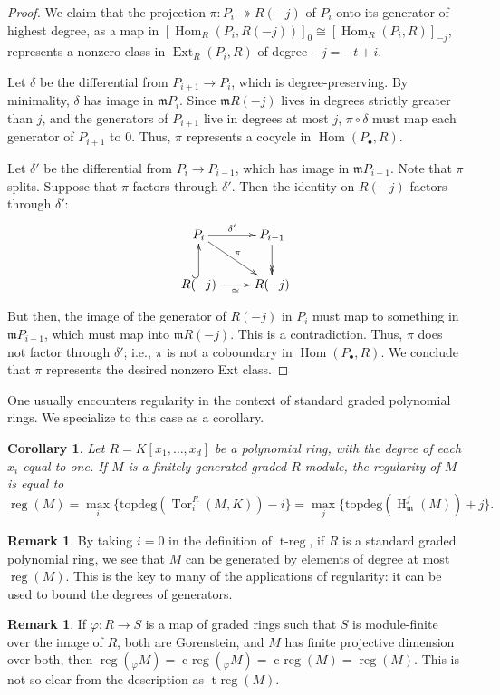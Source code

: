 \documentclass[11pt]{book}
\newtheorem{corollary}[theorem]{Corollary}
\numberwithin{equation}{section}
\numberwithin{theorem}{chapter}
\theoremstyle{definition}
\newtheorem*{basic properties}{Basic Properties}
\newtheorem*{Important Remark}{Important Remark}
\newtheorem{remark}[theorem]{Remark}
\theoremstyle{remark}
\newcommand{\m}{\mathfrak{m}}
\newcommand{\Hom}{\operatorname{Hom}}
\newcommand{\Ext}{\operatorname{Ext}}
\newcommand{\Tor}{\operatorname{Tor}}
\newcommand{\reg}{\operatorname{reg}}
\newcommand{\Treg}{\operatorname{t-reg}}
\newcommand{\Lreg}{\operatorname{c-reg}}
\newcommand{\tp}{\mathrm{topdeg}}
\renewcommand{\H}{\operatorname{H}}
\begin{document}
\begin{proof}
 We claim that the projection $\pi: P_i \twoheadrightarrow R(-j)$ of $P_i$ onto its generator of highest degree, as a map in $[\Hom_R(P_i,R(-j))]_0 \cong [\Hom_R(P_i,R)]_{-j}$, represents a nonzero class in $\Ext_R(P_i,R)$ of degree $-j=-t+i$. 
 
 Let $\delta$ be the differential from $P_{i+1}\to P_i$, which is degree-preserving. By minimality, $\delta$ has image in $\m P_i$. Since $\m R(-j)$ lives in degrees strictly greater than $j$, and the generators of $P_{i+1}$ live in degrees at most $j$, $\pi \circ \delta$ must map each generator of $P_{i+1}$ to $0$. Thus, $\pi$ represents a cocycle in $\Hom(P_\bullet,R)$. 

Let $\delta'$ be the differential from $P_{i}\to P_{i-1}$, which has image in $\m P_{i-1}$. Note that $\pi$ splits. Suppose that $\pi$ factors through $\delta'$. Then the identity on $R(-j)$ factors through $\delta'$:
	$$\xymatrix{P_i  \ar[r]^-{\delta'} \ar[dr]^-{\pi} & P_{i-1} \ar@{->>}[d] \\
	R(-j) \ar@{^(->}[u] \ar[r]_-{\cong} & R(-j)}$$
But then, the image of the generator of $R(-j)$ in $P_i$ must map to something in $\m P_{i-1}$, which must map into $\m R(-j)$. This is a contradiction. Thus, $\pi$ does not factor through $\delta'$; i.e., $\pi$ is not a coboundary in $\Hom(P_\bullet,R)$. We conclude that $\pi$ represents the desired nonzero Ext class.
\end{proof}

One usually encounters regularity in the context of standard graded polynomial rings. We specialize to this case as a corollary.

\begin{corollary}
Let $R=K[x_1,\dots,x_d]$ be a polynomial ring, with the degree of each $x_i$ equal to one. If $M$ is a finitely generated graded $R$-module, the regularity of $M$ is equal to
\[ \reg(M) = \max_i\{ \tp(\Tor^R_i(M,K))-i\} = \max_j\{ \tp(\H^j_{\m}(M))+j\}.\]
\end{corollary}

\begin{remark}
By taking $i=0$ in the definition of $\Treg$, if $R$ is a standard graded polynomial ring, we see that $M$ can be generated by elements of degree at most $\reg(M)$. This is the key to many of the applications of regularity: it can be used to bound the degrees of generators.
\end{remark}

\begin{remark}
If $\varphi:R\to S$ is a map of graded rings such that $S$ is module-finite over the image of $R$, both are Gorenstein, and $M$ has finite projective dimension over both, then $\reg( _\varphi M) = \Lreg( _\varphi M) = \Lreg(M) = \reg(M)$. This is not so clear from the description as $\Treg(M)$. 
\end{remark}
\end{document}

